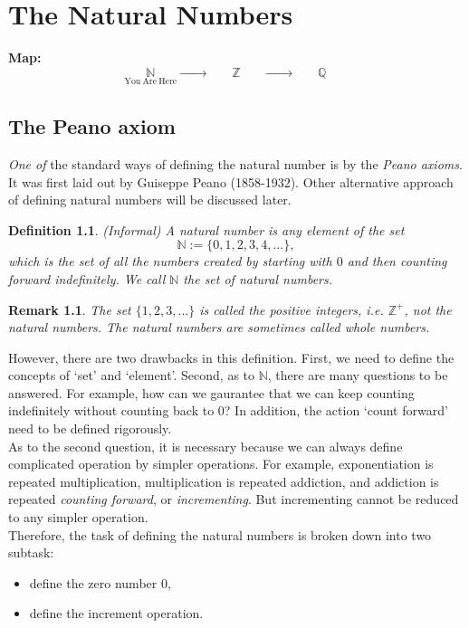 \documentclass[a4paper,oneside]{book}
\newtheorem{definition}{Definition}[section]
\newtheorem{remark}{Remark}[section]
\begin{document}
	\chapter{The Natural Numbers}
		\label{The Natural Numbers}
		\textbf{Map:}
		\begin{equation*}
			\underset{\mathrm{You~Are~Here}}{\mathbb{N}} \xrightarrow{\quad \quad\quad}\underset{\mathrm{\phantom{\mathrm{You~Are~Here}}}}{\mathbb{Z}}\xrightarrow{\quad\quad\quad}\underset{\mathrm{\phantom{\mathrm{You~Are~Here}}}}{\mathbb{Q}}
		\end{equation*}
		\section{The Peano axiom}
			\textit{One of} the standard ways of defining the natural number is by the \textit{Peano axioms}. It was first laid out by Guiseppe Peano (1858-1932). Other alternative approach of defining natural numbers will be discussed later.
			\begin{definition}
				(Informal) A \textit{natural number} is any element of the set $$\mathbb{N} := \{0,1,2,3,4,...\},$$ which is the set of all the numbers created by starting with $0$ and then counting forward indefinitely. We call $\mathbb{N}$ the \textit{set of natural numbers}.
			\end{definition}
			\begin{remark}
				The set $\{1,2,3,...\}$ is called \textit{the positive integers}, i.e. ${\mathbb{Z}}^{+}$, not the natural numbers. The natural numbers are sometimes called \textit{whole numbers}.
			\end{remark}
			However, there are two drawbacks in this definition. First, we need to define the concepts of `set' and `element'. Second, as to $\mathbb{N}$, there are many questions to be answered. For example, how can we gaurantee that we can keep counting indefinitely without counting back to $0$? In addition, the action `count forward' need to be defined rigorously.\\
			As to the second question, it is necessary because we can always define complicated operation by simpler operations. For example, exponentiation is repeated multiplication, multiplication is repeated addiction, and addiction is repeated \textit{counting forward}, or \textit{incrementing}. But incrementing cannot be reduced to any simpler operation.\\
			Therefore, the task of defining the natural numbers is broken down into two subtask:
			\begin{itemize}
				\item define the zero number $0$,
				\item define the increment operation.
			\end{itemize}
\end{document}
